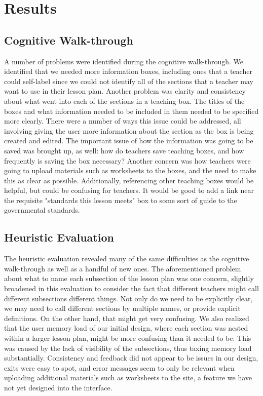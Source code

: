 \documentclass[10pt,letter]{article}
\begin{document}
\section{Results}
\subsection{Cognitive Walk-through}
A number of problems were identified during the cognitive walk-through.  We
identified that we needed more information boxes, including ones that a teacher
could self-label since we could not identify all of the sections that a teacher
may want to use in their lesson plan.  Another problem was clarity and
consistency about what went into each of the sections in a teaching box.  The
titles of the boxes and what information needed to be included in them needed to
be specified more clearly.  There were a number of ways this issue could be
addressed, all involving giving the user more information about the section as
the box is being created and edited.  The important issue of how the information
was going to be saved was brought up, as well: how do teachers save teaching
boxes, and how frequently is saving the box necessary?  Another concern was how
teachers were going to upload materials such as worksheets to the boxes, and the
need to make this as clear as possible.  Additionally, referencing other
teaching boxes would be helpful, but could be confusing for teachers.  It would
be good to add a link near the requisite "standards this lesson meets" box to
some sort of guide to the governmental standards.

\subsection{Heuristic Evaluation}
The heuristic evaluation revealed many of the same difficulties as the cognitive
walk-through as well as a handful of new ones.  The aforementioned problem about
what to name each subsection of the lesson plan was one concern, slightly
broadened in this evaluation to consider the fact that different teachers might
call different subsections different things.  Not only do we need to be
explicitly clear, we may need to call different sections by multiple names, or
provide explicit definitions.  On the other hand, that might get very confusing.
We also realized that the user memory load of our initial design, where each
section was nested within a larger lesson plan, might be more confusing than it
needed to be.  This was caused by the lack of visibility of the subsections,
thus taxing memory load substantially.  Consistency and feedback did not appear
to be issues in our design, exits were easy to spot, and error messages seem to
only be relevant when uploading additional materials such as worksheets to the
site, a feature we have not yet designed into the interface.
\end{document}
